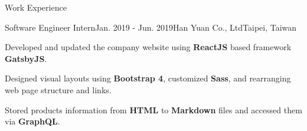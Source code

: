 \documentclass{resume} %
\begin{document}



\begin{rSection}{Work Experience}

\begin{rSubsection}{Software Engineer Intern}{Jan. 2019 - Jun. 2019}{Han Yuan Co., Ltd}{Taipei, Taiwan}
\item Developed and updated the company website using \textbf{ReactJS} based framework \textbf{GatsbyJS}.
\item Designed visual layouts using \textbf{Bootstrap 4}, customized \textbf{Sass}, and rearranging web page structure and links.
\item Stored products information from \textbf{HTML} to \textbf{Markdown} files and accessed them via \textbf{GraphQL}.

\end{rSubsection}

\end{rSection}
\end{document}
